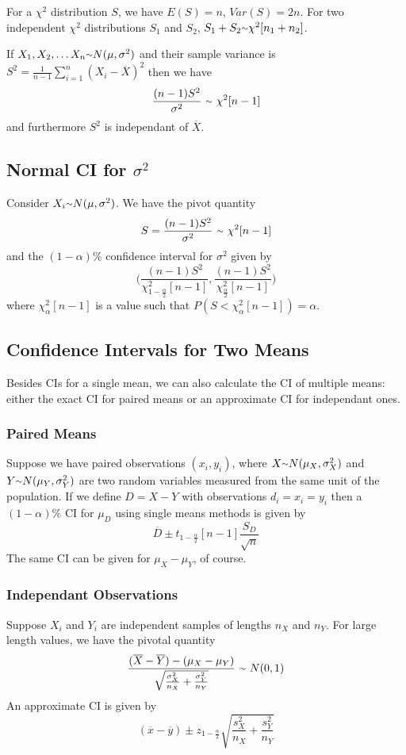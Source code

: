 \documentclass[12pt]{article}
\begin{document}
For a $\chi^2$ distribution $S$, we have $E(S) = n$, $Var(S) = 2n$. For two independent $\chi^2$ distributions $S_1$ and $S_2$, $S_1 + S_2 \ttilde \chi^2[n_1 + n_2]$.

If $X_1, X_2, \dots X_n \ttilde N(\mu, \sigma^2)$ and their sample variance is $S^2 = \frac{1}{n-1}\displaystyle\sum_{i=1}^n (X_i - \overline{X})^2$ then we have \[ \frac{(n-1)S^2}{\sigma^2}\ \ttilde\ \chi^2[n-1] \] and furthermore $S^2$ is independant of $\overline{X}$.

\subsection*{Normal CI for $\sigma^2$}
Consider $X_i \ttilde N(\mu,\sigma^2)$. We have the pivot quantity \[ S = \frac{(n-1)S^2}{\sigma^2}\ \ttilde\ \chi^2[n-1] \] and the $(1-\alpha)\%$ confidence interval for $\sigma^2$ given by \[ \bigg(\frac{(n-1)S^2}{\chi^2_{1-\frac{\alpha}{2}} [n-1]}, \frac{(n-1)S^2}{\chi^2_{\frac{\alpha}{2}} [n-1]} \bigg) \] where $\chi^2_\alpha[n-1]$ is a value such that $P(S < \chi^2_\alpha[n-1]) = \alpha$.

\subsection*{Confidence Intervals for Two Means}
Besides CIs for a single mean, we can also calculate the CI of multiple means: either the exact CI for paired means or an approximate CI for independant ones.

\subsubsection*{Paired Means}
Suppose we have paired observations $(x_i, y_i)$, where $X \ttilde N(\mu_X,\sigma^2_X)$ and $Y \ttilde N(\mu_Y, \sigma^2_Y)$ are two random variables measured from the same unit of the population. If we define $D = X - Y$ with observations $d_i = x_i = y_i$ then a $(1-\alpha)\%$ CI for $\mu_D$ using single means methods is given by \[ \overline{D} \pm t_{1-\frac{\alpha}{2}}[n-1]\frac{S_D}{\sqrt{n}} \] The same CI can be given for $\mu_X - \mu_Y$, of course.

\subsubsection*{Independant Observations}
Suppose $X_i$ and $Y_i$ are independent samples of lengths $n_X$ and $n_Y$. For large length values, we have the pivotal quantity \[ \frac{(\overline{X} - \overline{Y}) - (\mu_X - \mu_Y)}{\sqrt{\frac{\sigma^2_X}{n_X} + \frac{\sigma^2_Y}{n_Y}}}\ \ttilde\ N(0,1) \] An approximate CI is given by \[ (\overline x - \overline y) \pm z_{1-\frac \alpha 2} \sqrt{\frac{s^2_X}{n_X} + \frac{s^2_Y}{n_Y}} \]
\end{document}

